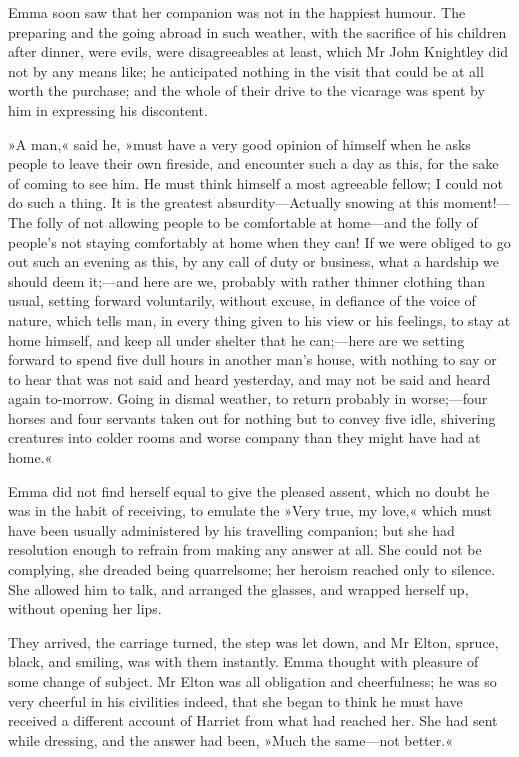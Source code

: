 Emma soon saw that her companion was not in the happiest humour. The preparing and the going abroad in such weather, with the sacrifice of his children after dinner, were evils, were disagreeables at least, which Mr John Knightley did not by any means like; he anticipated nothing in the visit that could be at all worth the purchase; and the whole of their drive to the vicarage was spent by him in expressing his discontent.

»A man,« said he, »must have a very good opinion of himself when he asks people to leave their own fireside, and encounter such a day as this, for the sake of coming to see him. He must think himself a most agreeable fellow; I could not do such a thing. It is the greatest absurdity—Actually snowing at this moment!—The folly of not allowing people to be comfortable at home—and the folly of people's not staying comfortably at home when they can! If we were obliged to go out such an evening as this, by any call of duty or business, what a hardship we should deem it;—and here are we, probably with rather thinner clothing than usual, setting forward voluntarily, without excuse, in defiance of the voice of nature, which tells man, in every thing given to his view or his feelings, to stay at home himself, and keep all under shelter that he can;—here are we setting forward to spend five dull hours in another man's house, with nothing to say or to hear that was not said and heard yesterday, and may not be said and heard again to-morrow. Going in dismal weather, to return probably in worse;—four horses and four servants taken out for nothing but to convey five idle, shivering creatures into colder rooms and worse company than they might have had at home.«

Emma did not find herself equal to give the pleased assent, which no doubt he was in the habit of receiving, to emulate the »Very true, my love,« which must have been usually administered by his travelling companion; but she had resolution enough to refrain from making any answer at all. She could not be complying, she dreaded being quarrelsome; her heroism reached only to silence. She allowed him to talk, and arranged the glasses, and wrapped herself up, without opening her lips.

They arrived, the carriage turned, the step was let down, and Mr Elton, spruce, black, and smiling, was with them instantly. Emma thought with pleasure of some change of subject. Mr Elton was all obligation and cheerfulness; he was so very cheerful in his civilities indeed, that she began to think he must have received a different account of Harriet from what had reached her. She had sent while dressing, and the answer had been, »Much the same—not better.«

